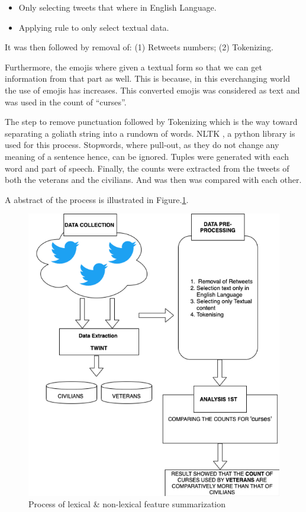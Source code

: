 \begin{itemize}
  \item Only selecting tweets that where in English Language.
  \item Applying rule to only select textual data.
\end{itemize}

It was then followed by removal of: (1) Retweets numbers; (2) Tokenizing.

Furthermore, the emojis where given a textual form so that we can get information from that part as well. This is because, in this everchanging world the use of emojis has increases. This converted emojis was considered as text and was used in the count of “curses”.

The step to remove punctuation followed by Tokenizing which is the way toward separating a goliath string into a rundown of words. NLTK \citep{NLTK}, a python library is used for this process. Stopwords, where pull-out, as they do not change any meaning of a sentence hence, can be ignored. Tuples were generated with each word and part of speech. Finally, the counts were extracted from the tweets of both the veterans and the civilians. And was then was compared with each other.

A abstract of the process is illustrated in Figure.\ref{fig:exp1}.

\begin{figure}[h]
  \centering
  \includegraphics{images/exp1process.png}
  \caption{Process of lexical \& non-lexical feature summarization}
  \label{fig:exp1}
\end{figure}

